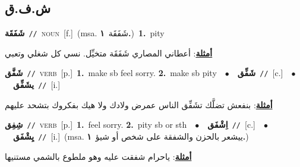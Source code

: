 \documentclass[10pt,a4paper,twoside]{article} %
\begin{document}
\begin{multicols}{2}
\vspace{-3mm}
\subsection*{\color{blue}\foreignlanguage{arabic}{ش.ف.ق}\color{blue}{}} 

{\setlength\topsep{0pt}\textbf{\foreignlanguage{arabic}{شَفَقَة}}\ {\color{gray}\texttt{//}\color{black}}\ \textsc{noun}\ [f.]\ \color{gray}(msa. \foreignlanguage{arabic}{شَفَقَة}~\foreignlanguage{arabic}{\textbf{١.}})\color{black}\ \textbf{1.}~pity\  \begin{flushright}\color{gray}\foreignlanguage{arabic}{\textbf{\underline{\foreignlanguage{arabic}{أمثلة}}}: أعطاني المصاري شَفَقَة متخيِّل. نسي كل شغلي وتعبي}\end{flushright}\color{black}} \vspace{2mm}

{\setlength\topsep{0pt}\textbf{\foreignlanguage{arabic}{شَفَّق}}\ {\color{gray}\texttt{//}\color{black}}\ \textsc{verb}\ [p.]\ \textbf{1.}~make sb feel sorry.  \textbf{2.}~make sb pity\ \ $\bullet$\ \ \setlength\topsep{0pt}\textbf{\foreignlanguage{arabic}{شَفِّق}}\ {\color{gray}\texttt{//}\color{black}}\ [c.]\ \ $\bullet$\ \ \setlength\topsep{0pt}\textbf{\foreignlanguage{arabic}{يشَفِّق}}\ {\color{gray}\texttt{//}\color{black}}\ [i.]\  \begin{flushright}\color{gray}\foreignlanguage{arabic}{\textbf{\underline{\foreignlanguage{arabic}{أمثلة}}}: بنفعش تضلَّك تشَفِّق الناس عمرض ولادك ولا هيك بفكروك بتشحد عليهم}\end{flushright}\color{black}} \vspace{2mm}

{\setlength\topsep{0pt}\textbf{\foreignlanguage{arabic}{شِفِق}}\ {\color{gray}\texttt{//}\color{black}}\ \textsc{verb}\ [p.]\ \textbf{1.}~feel sorry.  \textbf{2.}~pity sb or sth\ \ $\bullet$\ \ \setlength\topsep{0pt}\textbf{\foreignlanguage{arabic}{اِشْفَق}}\ {\color{gray}\texttt{//}\color{black}}\ [c.]\ \ $\bullet$\ \ \setlength\topsep{0pt}\textbf{\foreignlanguage{arabic}{يِشْفَق}}\ {\color{gray}\texttt{//}\color{black}}\ [i.]\ \color{gray}(msa. \foreignlanguage{arabic}{ييشعر بالحزن والشفقة على شخص أو شيؤ}~\foreignlanguage{arabic}{\textbf{١.}})\color{black}\  \begin{flushright}\color{gray}\foreignlanguage{arabic}{\textbf{\underline{\foreignlanguage{arabic}{أمثلة}}}: ياحرام شفقت عليه وهو ملطوع بالشمي مستنيها}\end{flushright}\color{black}} \vspace{2mm}


\end{multicols}
\end{document}
